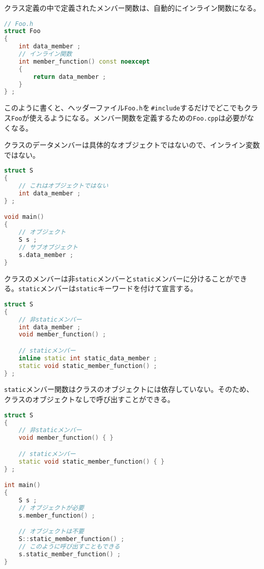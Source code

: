 クラス定義の中で定義されたメンバー関数は、自動的にインライン関数になる。

\begin{lstlisting}[language={C++}]
// Foo.h
struct Foo
{
    int data_member ;
    // インライン関数
    int member_function() const noexcept
    {
        return data_member ;
    }
} ;
\end{lstlisting}

このように書くと、ヘッダーファイル\texttt{Foo.h}を\,\texttt{\#include}するだけでどこでもクラス\texttt{Foo}が使えるようになる。メンバー関数を定義するための\texttt{Foo.cpp}は必要がなくなる。

クラスのデータメンバーは具体的なオブジェクトではないので、インライン変数ではない。

\begin{lstlisting}[language={C++}]
struct S
{
    // これはオブジェクトではない
    int data_member ;
} ;

void main()
{
    // オブジェクト
    S s ;
    // サブオブジェクト
    s.data_member ; 
}
\end{lstlisting}


クラスのメンバーは非\texttt{static}メンバーと\texttt{static}メンバーに分けることができる。\texttt{static}メンバーは\texttt{static}キーワードを付けて宣言する。

\begin{lstlisting}[language={C++}]
struct S
{
    // 非staticメンバー
    int data_member ;
    void member_function() ;

    // staticメンバー
    inline static int static_data_member ;
    static void static_member_function() ;
} ;
\end{lstlisting}

\texttt{static}メンバー関数はクラスのオブジェクトには依存していない。そのため、クラスのオブジェクトなしで呼び出すことができる。

\ifTombow\pagebreak\fi
\begin{lstlisting}[language={C++}]
struct S
{
    // 非staticメンバー
    void member_function() { }

    // staticメンバー
    static void static_member_function() { }
} ;

int main()
{
    S s ;
    // オブジェクトが必要
    s.member_function() ;

    // オブジェクトは不要
    S::static_member_function() ;
    // このように呼び出すこともできる
    s.static_member_function() ;
}
\end{lstlisting}

